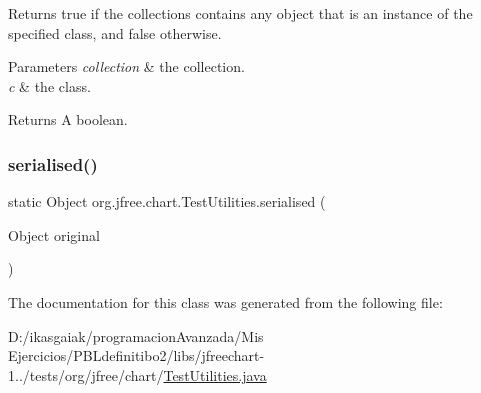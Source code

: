 Returns {\ttfamily true} if the collections contains any object that is an instance of the specified class, and {\ttfamily false} otherwise.


\begin{DoxyParams}{Parameters}
{\em collection} & the collection. \\
\hline
{\em c} & the class.\\
\hline
\end{DoxyParams}
\begin{DoxyReturn}{Returns}
A boolean. 
\end{DoxyReturn}
\mbox{\label{classorg_1_1jfree_1_1chart_1_1_test_utilities_a07bff6b8c9ae8560a08797ac377d8d91}} 
\subsubsection{\texorpdfstring{serialised()}{serialised()}}
{\footnotesize\ttfamily static Object org.\+jfree.\+chart.\+Test\+Utilities.\+serialised (\begin{DoxyParamCaption}\item[{Object}]{original }\end{DoxyParamCaption})\hspace{0.3cm}{\ttfamily [static]}}



The documentation for this class was generated from the following file\+:\begin{DoxyCompactItemize}
\item 
D\+:/ikasgaiak/programacion\+Avanzada/\+Mis Ejercicios/\+P\+B\+Ldefinitibo2/libs/jfreechart-\/1../tests/org/jfree/chart/\mbox{\hyperlink{_test_utilities_8java}{Test\+Utilities.\+java}}\end{DoxyCompactItemize}
